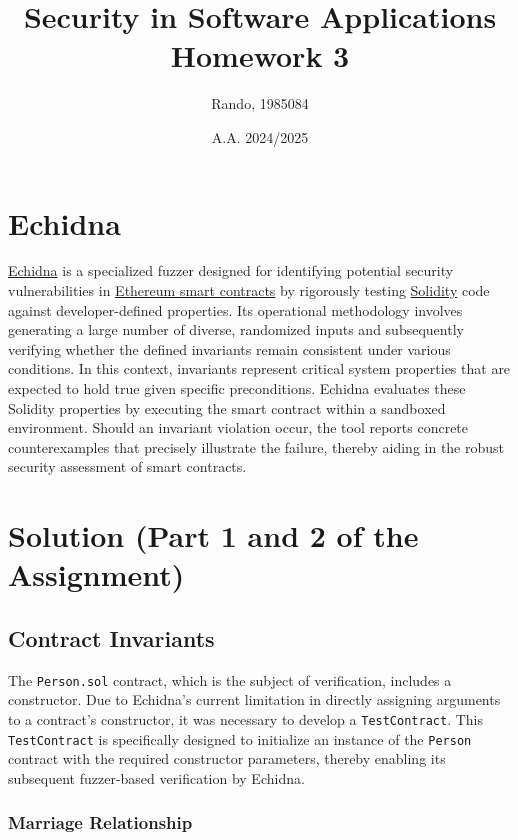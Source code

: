 \documentclass[a4paper,10pt]{article}
\title{Security in Software Applications\\Homework 3}
\author{Rando, 1985084}
\date{A.A. 2024/2025}
\begin{document}
\maketitle

\section{Echidna}


\href{https://github.com/crytic/echidna}{Echidna} is a specialized fuzzer designed for identifying potential security vulnerabilities in \href{https://ethereum.org/en/developers/docs/smart-contracts/}{Ethereum smart contracts} by rigorously testing \href{https://docs.soliditylang.org/en/v0.8.30/}{Solidity} code against developer-defined properties. Its operational methodology involves generating a large number of diverse, randomized inputs and subsequently verifying whether the defined invariants remain consistent under various conditions. In this context, invariants represent critical system properties that are expected to hold true given specific preconditions. Echidna evaluates these Solidity properties by executing the smart contract within a sandboxed environment. Should an invariant violation occur, the tool reports concrete counterexamples that precisely illustrate the failure, thereby aiding in the robust security assessment of smart contracts.

\section{Solution (Part 1 and 2 of the Assignment)}

\subsection{Contract Invariants}

The \verb|Person.sol| contract, which is the subject of verification, includes a constructor. Due to Echidna's current limitation in directly assigning arguments to a contract's constructor, it was necessary to develop a \verb|TestContract|. This \verb|TestContract| is specifically designed to initialize an instance of the \verb|Person| contract with the required constructor parameters, thereby enabling its subsequent fuzzer-based verification by Echidna.

\subsubsection{Marriage Relationship}
\end{document}
